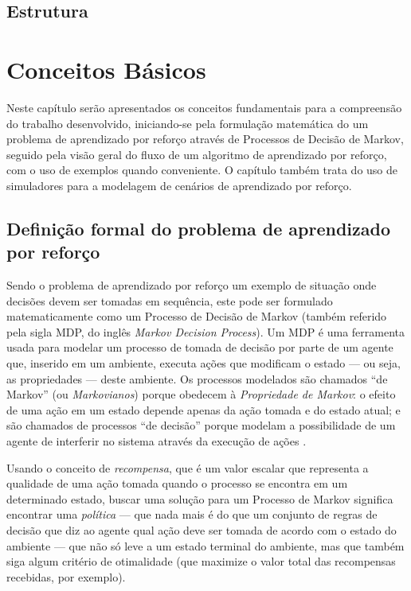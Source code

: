 \documentclass[cic,tc]{iiufrgs}
\begin{document}
\section{Estrutura}
\blindtext


\chapter{Conceitos Básicos}
\label{basic_concepts}
Neste capítulo serão apresentados os conceitos fundamentais para a compreensão
do trabalho desenvolvido, iniciando-se pela formulação matemática do um problema
de aprendizado por reforço através de Processos de Decisão de Markov, seguido
pela visão geral do fluxo de um algoritmo de aprendizado por reforço, com o uso
de exemplos quando conveniente. O capítulo também trata do uso de simuladores
para a modelagem de cenários de aprendizado por reforço.

\section{Definição formal do problema de aprendizado por reforço}
\label{markov_process}
Sendo o problema de aprendizado por reforço um exemplo de situação onde decisões
devem ser tomadas em sequência, este pode ser formulado matematicamente como um
Processo de Decisão de Markov (também referido pela sigla MDP, do inglês
\textit{Markov Decision Process}). Um MDP é uma ferramenta usada para modelar
um processo de tomada de decisão por parte de um agente que, inserido em um
ambiente, executa ações que modificam o estado --- ou seja, as propriedades ---
deste ambiente.
Os processos modelados são chamados ``de Markov'' (ou \textit{Markovianos})
porque obedecem à \textit{Propriedade de Markov}: o efeito de uma ação em um
estado depende apenas da ação tomada e do estado atual; e são chamados de
processos ``de decisão''  porque modelam a possibilidade de um agente de
interferir no sistema através da execução de ações \cite{Bellman1957}.


Usando o conceito de \textit{recompensa}, que é um valor escalar que representa
a qualidade de uma ação tomada quando o processo se encontra em um determinado
estado, buscar uma solução para um Processo de Markov significa encontrar uma
\textit{política} --- que nada mais é do que um conjunto de regras de decisão
que diz ao agente qual ação deve ser tomada de acordo com o estado do ambiente
--- que não só leve a um estado terminal do ambiente, mas que também siga algum
critério de otimalidade (que maximize o valor total das recompensas recebidas,
por exemplo).
\end{document}
